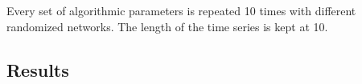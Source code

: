 % 
%    
Every set of algorithmic parameters is repeated 10 times with different randomized networks. The length of the time series is kept at 10.


\subsection{Results}
%  
    
